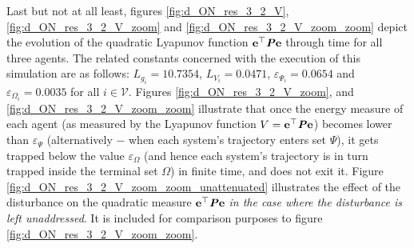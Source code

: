 Last but not at all least, figures
\eqref{fig:d_ON_res_3_2_V}, \eqref{fig:d_ON_res_3_2_V_zoom} and
\eqref{fig:d_ON_res_3_2_V_zoom_zoom} depict
the evolution of the quadratic Lyapunov function
$\bm{\mathbf{e}}^{\top} \bm{\mathit{P}} \bm{\mathbf{e}}$ through time for all three agents.
The related constants concerned with the execution
of this simulation are as follows: $L_{g_i} = 10.7354$, $L_{V_i} = 0.0471$,
$\varepsilon_{\Psi_i} = 0.0654$ and $\varepsilon_{\Omega_i} = 0.0035$ for
all $i \in \mathcal{V}$. Figures \eqref{fig:d_ON_res_3_2_V_zoom},
and \eqref{fig:d_ON_res_3_2_V_zoom_zoom}
illustrate that once the energy measure of each agent (as measured by
the Lyapunov function $V = \bm{\mathbf{e}}^{\top} \bm{\mathit{P}} \bm{\mathbf{e}}$) becomes lower than
$\varepsilon_{\Psi}$ (alternatively $-$ when each system's trajectory enters
set $\Psi$), it gets trapped below the value $\varepsilon_{\Omega}$ (and
hence each system's trajectory is in turn trapped inside the terminal
set $\Omega$) in finite time, and does not exit it.
Figure \eqref{fig:d_ON_res_3_2_V_zoom_zoom_unattenuated} illustrates the
effect of the disturbance on the quadratic measure
$\bm{\mathbf{e}}^{\top} \bm{\mathit{P}} \bm{\mathbf{e}}$ \textit{in the case where the disturbance is
left unaddressed}. It is included for comparison purposes to figure
\eqref{fig:d_ON_res_3_2_V_zoom_zoom}.


\noindent{}\\[2.5ex]

